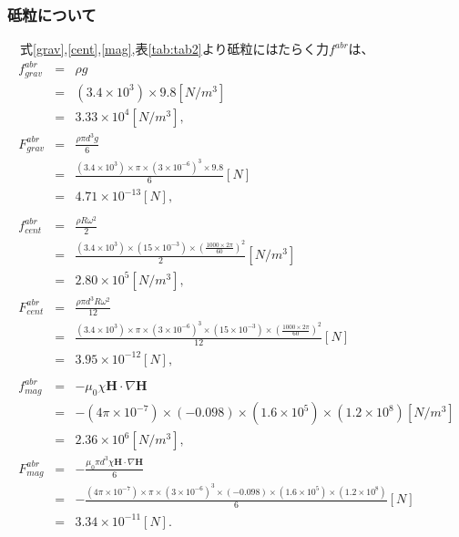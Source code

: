 \documentclass[12pt]{jarticle}
\begin{document}
    \subsubsection{砥粒について}
　式\ref{grav},\ref{cent},\ref{mag},表\ref{tab:tab2}より砥粒にはたらく力$f^{abr}$は、
      \begin{eqnarray}
        f^{abr}_{grav} & = & \rho g\nonumber \\
                        & = & (3.4\times10^3) \times 9.8 [N/m^3]\nonumber \\ 
                        & = & 3.33 \times 10^4 [N/m^3], \\ 
        F^{abr}_{grav} & = & \frac{ \rho \pi d^3 g }{6} \nonumber \\
                        & = & \frac{ (3.4\times10^3) \times \pi \times (3\times10^{-6})^3 \times 9.8 }{6} [N]\nonumber \\ 
                        & = & 4.71 \times 10^{-13} [N], \\ \nonumber \\
        f^{abr}_{cent} & = & \frac{ \rho R \omega^2 }{2}\nonumber \\
                        & = & \frac{ (3.4\times10^3) \times (15\times10^{-3}) \times (\frac{1000\times2\pi}{60})^2 }{2}[N/m^3]\nonumber \\
                        & = & 2.80 \times 10^5 [N/m^3], \\ 
        F^{abr}_{cent} & = & \frac{ \rho \pi d^3 R \omega^2 }{12}\nonumber \\
                        & = & \frac{ (3.4\times10^3) \times \pi \times (3\times10^{-6})^3 \times (15\times10^{-3}) \times (\frac{1000\times2\pi}{60})^2 }{12} [N] \nonumber \\
                        & = & 3.95 \times 10^{-12} [N] , \\ \nonumber \\
        f^{abr}_{mag} & = & - \mu_0 \chi \bm{H} \cdot \nabla \bm{H} \nonumber \\
                       & = & - (4\pi \times 10^{-7}) \times (-0.098) \times (1.6\times10^5) \times (1.2\times10^8) [N/m^3] \nonumber \\
                       & = & 2.36 \times 10^6 [N/m^3], \\
        F^{abr}_{mag} & = & - \frac{ \mu_0 \pi d^3 \chi \bm{H} \cdot \nabla \bm{H} }{6}  \nonumber \\
                       & = & - \frac{ (4\pi \times 10^{-7}) \times \pi \times (3\times10^{-6})^3 \times (-0.098) \times (1.6\times10^5) \times (1.2\times10^8) }{6} [N]\nonumber \\
                       & = & 3.34 \times 10^{-11} [N].
      \end{eqnarray}
\end{document}
